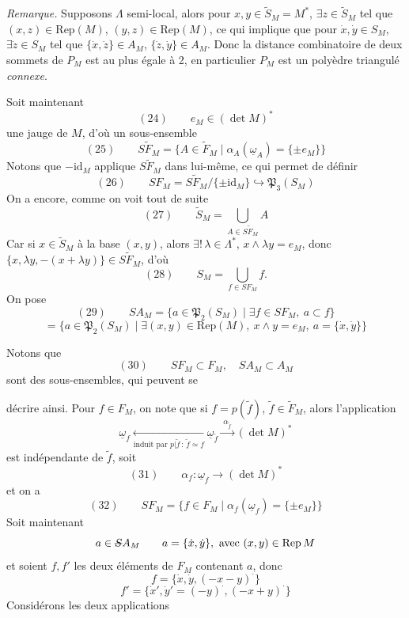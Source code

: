\documentclass[11pt,a4paper]{article}
\begin{document}
\emph{Remarque.} Supposons $\Lambda$ semi-local, alors pour $x, y \in \widetilde{S}_M = M^*$, $\exists z \in \widetilde{S}_M$ tel que $(x,z) \in \mathrm{Rep}(M)$, $(y,z) \in \mathrm{Rep}(M)$, ce qui implique que pour $\dot{x}, \dot{y} \in S_M$, $\exists \dot{z} \in S_M$ tel que $\{\dot{x}, \dot{z}\} \in A_M$, $\{\dot{z}, \dot{y}\} \in A_M$. Donc la distance combinatoire de deux  sommets de $P_M$ est au plus égale à 2, en particulier $P_M$ est un polyèdre triangulé \emph{connexe}.

Soit maintenant
\[
(24)\qquad e_M \in (\det M)^*
\]
une jauge de $M$, d'où un sous-ensemble
\[
(25)\qquad S\widetilde{F}_M = \{ A \in \widetilde{F}_M \mid \alpha_A(\underline{\omega}_A) = \{\pm e_M\} \}
\]
Notons que $-\mathrm{id}_M$ applique $S\widetilde{F}_M$ dans lui-même, ce qui permet de définir
\[
(26)\qquad SF_M = S\widetilde{F}_M/\{\pm \mathrm{id}_M\} \hookrightarrow \mathfrak{P}_3(S_M)
\]
On a encore, comme on voit tout de suite
\[
(27)\qquad \widetilde{S}_M = \bigcup_{A \in S\widetilde{F}_M} A
\]
Car si $x \in \widetilde{S}_M$ \ill{} à la base $(x,y)$, alors $\exists!\, \lambda \in \Lambda^*$,  $x \wedge \lambda y = e_M$, donc $\{x, \lambda y, -(x + \lambda y)\} \in S\widetilde{F}_M$, d'où
\[
(28)\qquad S_M = \bigcup_{f \in SF_M} f .
\]
On pose
\[
(29)\qquad SA_M = \{ a \in \mathfrak{P}_2(S_M) \mid \exists f \in SF_M,\ a \subset f \}
\]
\[
= \{ a \in \mathfrak{P}_2(S_M) \mid \exists (x,y) \in \mathrm{Rep}(M),\ x \wedge y = e_M,\ a = \{\dot{x}, \dot{y}\} \}
\]

Notons que
\[
(30)\qquad SF_M \subset F_M, \quad SA_M \subset A_M
\]
sont des sous-ensembles, qui peuvent se

décrire ainsi. Pour $f \in F_M$,  on note que si $f = p(\widetilde{f})$, $\widetilde{f} \in \widetilde{F}_M$, alors  l'application 
\[
\underline{\omega}_f \xleftarrow[\text{induit par } p|\widetilde{f} \,:\, \widetilde{f} \simeq f]{} \underline{\omega}_{\widetilde{f}} \xrightarrow{\ \alpha_{\widetilde{f}}\ } (\det M)^*
\]
est indépendante de $\widetilde{f}$, soit
\[
(31)\qquad \alpha_f : \underline{\omega}_f \longrightarrow (\det M)^*
\]
et on a
\[
(32)\qquad SF_M = \{ f \in F_M \mid \alpha_f(\underline{\omega}_f) = \{\pm e_M\} \}
\]
Soit maintenant
\[
a \in \text{\struck{$S$}}A_M \qquad a = \{\dot{x}, \dot{y}\}, \text{ avec } (x,y) \in \mathrm{Rep}\, M
\]
et soient $f, f'$ les deux éléments de $F_M$ contenant $a$, donc
\[
f = \{\dot{x}, \dot{y}, (-x-y)^{\cdot}\}
\]
\[
f' = \{\dot{x}', \dot{y}' = (-y)^{\cdot}, (-x+y)^{\cdot}\}
\]
Considérons les deux applications
\end{document}
